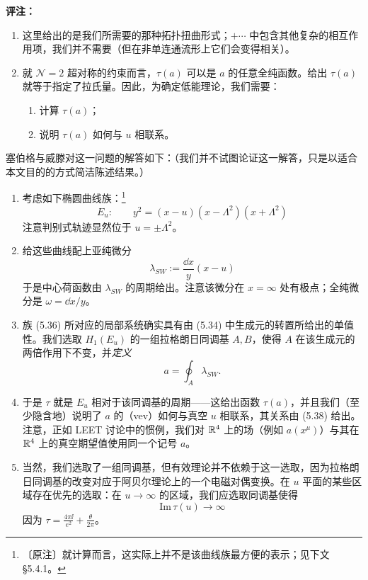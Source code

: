 \medskip
\noindent\textbf{评注：}
\begin{enumerate}[label=\arabic*., leftmargin=2.1em]
\item 这里给出的是我们所需要的那种拓扑扭曲形式；$+\cdots$ 中包含其他复杂的相互作用项，我们并不需要（但在非单连通流形上它们会变得相关）。
\item 就 $\mathcal{N}=2$ 超对称的约束而言，$\tau(a)$ 可以是 $a$ 的任意全纯函数。给出 $\tau(a)$ 就等于指定了拉氏量。因此，为确定低能理论，我们需要：
\begin{enumerate}[label=\alph*.), leftmargin=1.8em]
\item 计算 $\tau(a)$；
\item 说明 $\tau(a)$ 如何与 $u$ 相联系。
\end{enumerate}
\end{enumerate}

塞伯格与威滕对这一问题的解答如下：（我们并不试图论证这一解答，只是以适合本文目的的方式简洁陈述结果。）

\begin{enumerate}[label=\arabic*., leftmargin=2.1em]
\item 考虑如下椭圆曲线族：\footnote{〔原注〕就计算而言，这实际上并不是该曲线族最方便的表示；见下文 §5.4.1。}
\begin{equation}
E_{u}:\qquad y^{2}=(x-u)(x-\Lambda^{2})(x+\Lambda^{2})
\tag{5.36}
\end{equation}
注意判别式轨迹显然位于 $u=\pm\Lambda^{2}$。
\item 给这些曲线配上亚纯微分
\begin{equation}
\lambda_{SW}:=\frac{\dd x}{y}(x-u)
\tag{5.37}
\end{equation}
于是中心荷函数由 $\lambda_{SW}$ 的周期给出。注意该微分在 $x=\infty$ 处有极点；全纯微分是 $\omega=\dd x/y$。
\item 族 (5.36) 所对应的局部系统确实具有由 (5.34) 中生成元的转置所给出的单值性。我们选取 $H_{1}(E_{u})$ 的一组拉格朗日同调基 $A,B$，使得 $A$ 在该生成元的两倍作用下不变，并\emph{定义}
\begin{equation}
a=\oint_{A}\lambda_{SW}.
\tag{5.38}
\end{equation}
\item 于是 $\tau$ 就是 $E_{u}$ 相对于该同调基的周期——这给出函数 $\tau(a)$，并且我们（至少隐含地）说明了 $a$ 的（vev）如何与真空 $u$ 相联系，其关系由 (5.38) 给出。注意，正如 LEET 讨论中的惯例，我们对 $\mathbb{R}^{4}$ 上的场（例如 $a(x^{\mu})$）与其在 $\mathbb{R}^{4}$ 上的真空期望值使用同一个记号 $a$。
\item 当然，我们选取了一组同调基，但有效理论并不依赖于这一选取，因为拉格朗日同调基的改变对应于阿贝尔理论上的一个电磁对偶变换。在 $u$ 平面的某些区域存在优先的选取：在 $u\to\infty$ 的区域，我们应选取同调基使得
\begin{equation}
\mathrm{Im}\,\tau(u)\to\infty
\tag{5.39}
\end{equation}
因为 $\tau=\frac{4\pi\ii}{e^{2}}+\frac{\theta}{2\pi}$。
\end{enumerate}

